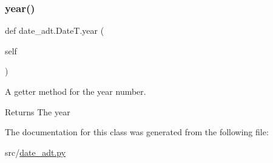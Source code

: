 \subsubsection{\texorpdfstring{year()}{year()}}
{\footnotesize\ttfamily def date\+\_\+adt.\+Date\+T.\+year (\begin{DoxyParamCaption}\item[{}]{self }\end{DoxyParamCaption})}



A getter method for the year number. 

\begin{DoxyReturn}{Returns}
The year 
\end{DoxyReturn}


The documentation for this class was generated from the following file\+:\begin{DoxyCompactItemize}
\item 
src/\hyperlink{date__adt_8py}{date\+\_\+adt.\+py}\end{DoxyCompactItemize}
